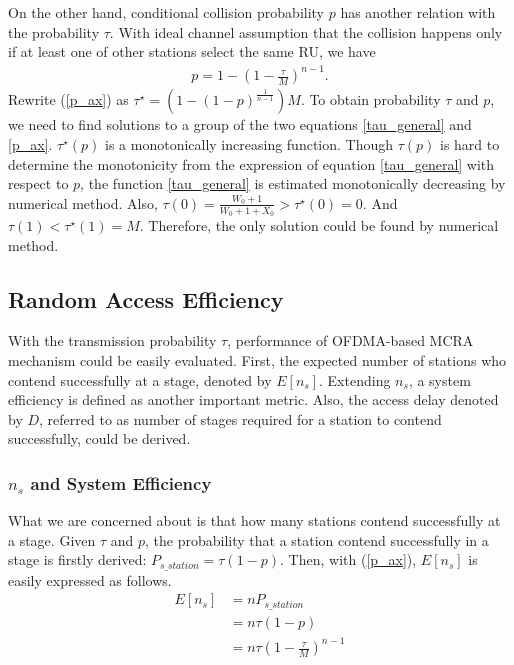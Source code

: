 \documentclass[journal]{IEEEtran}
\begin{document}
On the other hand, conditional collision probability $p$ has another relation with the probability $\tau$. 
With ideal channel assumption that the collision happens only if at least one of other stations select the same RU, we have 
\begin{align}
\label{p_ax}
p = 1-\left( 1-\frac{\tau}{M} \right)^{n-1}.
\end{align}
Rewrite (\ref{p_ax}) as $\tau^\star = \left(1-(1-p)^\frac{1}{n-1} \right)M$. 
To obtain probability $\tau$ and $p$, we need to find solutions to a group of the two equations \ref{tau_general} and \ref{p_ax}.
$\tau^\star(p)$ is a monotonically increasing function. 
Though $\tau(p)$ is hard to determine the monotonicity from the expression of equation \ref{tau_general} with respect to $p$, the  function \ref{tau_general} is estimated monotonically decreasing by numerical method. 
Also, $\tau(0) = \frac{W_0+1}{W_0+1+X_0}> \tau^\star(0) = 0$.
And $\tau(1) < \tau^\star(1) = M$. 
Therefore, the only solution could be found by numerical method.



\subsection{Random Access Efficiency}
With the transmission probability $\tau$, performance of OFDMA-based MCRA mechanism could be easily evaluated. 
First, the expected number of stations who contend successfully at a stage, denoted by $E[n_s]$. 
Extending $n_s$, a system efficiency is defined as another important metric.
Also, the access delay denoted by $D$, referred to as number of stages required for a station to contend successfully, could be derived. 

\subsubsection{$n_s$ and System Efficiency}
What we are concerned about is that how many stations contend successfully at a stage.
Given $\tau$ and $p$, the probability that a station contend successfully in a stage is firstly derived: $P_{s\_station} = \tau (1-p)$.
Then, with (\ref{p_ax}), $E[n_s]$ is easily expressed as follows. 
\begin{align}
\label{equ_ns}
E[n_s] &= n P_{s\_station} \nonumber \\
		&= n\tau (1-p) \nonumber \\
		&= n\tau (1-\frac{\tau}{M})^{n-1}
\end{align}
\end{document}

